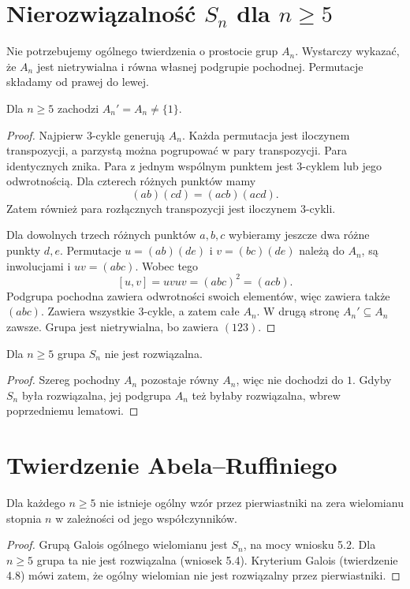 \section{Nierozwiązalność $S_n$ dla $n\ge5$}

Nie potrzebujemy ogólnego twierdzenia o prostocie grup $A_n$. Wystarczy wykazać, że $A_n$ jest nietrywialna i równa własnej podgrupie pochodnej. Permutacje składamy od prawej do lewej.

\begin{lemat}
Dla $n\ge5$ zachodzi $A_n'=A_n\ne\{1\}$.
\end{lemat}
\begin{proof}
Najpierw $3$-cykle generują $A_n$. Każda permutacja jest iloczynem transpozycji, a parzystą można pogrupować w pary transpozycji. Para identycznych znika. Para z jednym wspólnym punktem jest $3$-cyklem lub jego odwrotnością. Dla czterech różnych punktów mamy
\[
(ab)(cd)=(acb)(acd).
\]
Zatem również para rozłącznych transpozycji jest iloczynem $3$-cykli.

Dla dowolnych trzech różnych punktów $a,b,c$ wybieramy jeszcze dwa różne punkty $d,e$. Permutacje $u=(ab)(de)$ i $v=(bc)(de)$ należą do $A_n$, są inwolucjami i $uv=(abc)$. Wobec tego
\[
[u,v]=uvuv=(abc)^2=(acb).
\]
Podgrupa pochodna zawiera odwrotności swoich elementów, więc zawiera także $(abc)$. Zawiera wszystkie $3$-cykle, a zatem całe $A_n$. W drugą stronę $A_n'\subseteq A_n$ zawsze. Grupa jest nietrywialna, bo zawiera $(123)$.
\end{proof}

\begin{wniosek}
Dla $n\ge5$ grupa $S_n$ nie jest rozwiązalna.
\end{wniosek}
\begin{proof}
Szereg pochodny $A_n$ pozostaje równy $A_n$, więc nie dochodzi do $1$. Gdyby $S_n$ była rozwiązalna, jej podgrupa $A_n$ też byłaby rozwiązalna, wbrew poprzedniemu lematowi.
\end{proof}

\section{Twierdzenie Abela--Ruffiniego}

\begin{twierdzenie}
Dla każdego $n\ge5$ nie istnieje ogólny wzór przez pierwiastniki na zera wielomianu stopnia $n$ w zależności od jego współczynników.
\end{twierdzenie}
\begin{proof}
Grupą Galois ogólnego wielomianu jest $S_n$, na mocy wniosku 5.2. Dla $n\ge5$ grupa ta nie jest rozwiązalna (wniosek 5.4). Kryterium Galois (twierdzenie 4.8) mówi zatem, że ogólny wielomian nie jest rozwiązalny przez pierwiastniki.
\end{proof}

